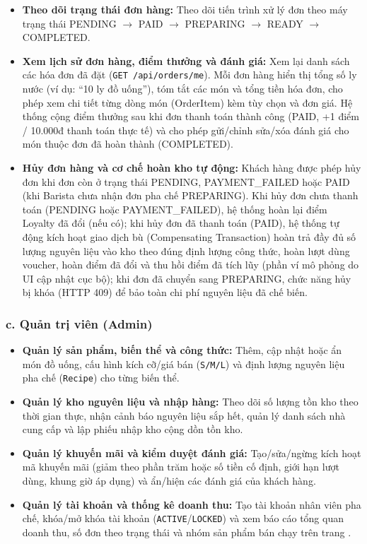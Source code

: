 \documentclass[12pt,a4paper]{report}
\begin{document}
\begin{itemize}[leftmargin=*]
\item \textbf{Theo dõi trạng thái đơn hàng:} Theo dõi tiến trình xử lý đơn theo máy trạng thái PENDING $\rightarrow$ PAID $\rightarrow$ PREPARING $\rightarrow$ READY $\rightarrow$ COMPLETED.
\item \textbf{Xem lịch sử đơn hàng, điểm thưởng và đánh giá:} Xem lại danh sách các hóa đơn đã đặt (\texttt{GET /api/orders/me}). Mỗi đơn hàng hiển thị tổng số ly nước (ví dụ: ``10 ly đồ uống''), tóm tắt các món và tổng tiền hóa đơn, cho phép xem chi tiết từng dòng món (OrderItem) kèm tùy chọn và đơn giá. Hệ thống cộng điểm thưởng sau khi đơn thanh toán thành công (PAID, +1 điểm / 10.000đ thanh toán thực tế) và cho phép gửi/chỉnh sửa/xóa đánh giá cho món thuộc đơn đã hoàn thành (COMPLETED).
\item \textbf{Hủy đơn hàng và cơ chế hoàn kho tự động:} Khách hàng được phép hủy đơn khi đơn còn ở trạng thái PENDING, PAYMENT\_FAILED hoặc PAID (khi Barista chưa nhận đơn pha chế PREPARING). Khi hủy đơn chưa thanh toán (PENDING hoặc PAYMENT\_FAILED), hệ thống hoàn lại điểm Loyalty đã đổi (nếu có); khi hủy đơn đã thanh toán (PAID), hệ thống tự động kích hoạt giao dịch bù (Compensating Transaction) hoàn trả đầy đủ số lượng nguyên liệu vào kho theo đúng định lượng công thức, hoàn lượt dùng voucher, hoàn điểm đã đổi và thu hồi điểm đã tích lũy (phần ví mô phỏng do UI cập nhật cục bộ); khi đơn đã chuyển sang PREPARING, chức năng hủy bị khóa (HTTP 409) để bảo toàn chi phí nguyên liệu đã chế biến.
\end{itemize}

\subsubsection*{c. Quản trị viên (Admin)}

\begin{itemize}[leftmargin=*]
\item \textbf{Quản lý sản phẩm, biến thể và công thức:} Thêm, cập nhật hoặc ẩn món đồ uống, cấu hình kích cỡ/giá bán (\texttt{S/M/L}) và định lượng nguyên liệu pha chế (\texttt{Recipe}) cho từng biến thể.
\item \textbf{Quản lý kho nguyên liệu và nhập hàng:} Theo dõi số lượng tồn kho theo thời gian thực, nhận cảnh báo nguyên liệu sắp hết, quản lý danh sách nhà cung cấp và lập phiếu nhập kho cộng dồn tồn kho.
\item \textbf{Quản lý khuyến mãi và kiểm duyệt đánh giá:} Tạo/sửa/ngừng kích hoạt mã khuyến mãi (giảm theo phần trăm hoặc số tiền cố định, giới hạn lượt dùng, khung giờ áp dụng) và ẩn/hiện các đánh giá của khách hàng.
\item \textbf{Quản lý tài khoản và thống kê doanh thu:} Tạo tài khoản nhân viên pha chế, khóa/mở khóa tài khoản (\texttt{ACTIVE}/\texttt{LOCKED}) và xem báo cáo tổng quan doanh thu, số đơn theo trạng thái và nhóm sản phẩm bán chạy trên trang .
\end{itemize}
\end{document}

